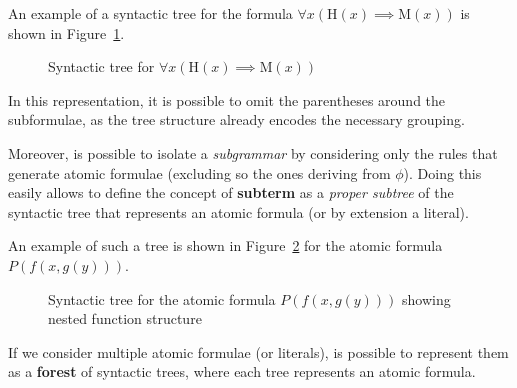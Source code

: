 An example of a syntactic tree for the formula \(\forall x \left(\text{H}(x) \implies \text{M}(x)\right)\) is shown in Figure~\ref{fig:syntactic_tree}.

\begin{figure}[H]
    \centering
    \caption{Syntactic tree for \(\forall x (\text{H}(x) \implies \text{M}(x))\)}\label{fig:syntactic_tree}
\end{figure}

In this representation, it is possible to omit the parentheses around the subformulae, as the tree structure already encodes the necessary grouping.

Moreover, is possible to isolate a \textit{subgrammar} by considering only the rules that generate atomic formulae (excluding so the ones deriving from \(\phi\)). Doing this easily allows to define the concept of \textbf{subterm} as a \textit{proper subtree} of the syntactic tree that represents an atomic formula (or by extension a literal).

An example of such a tree is shown in Figure~\ref{fig:subterm_tree} for the atomic formula \(P(f(x, g(y)))\).
\begin{figure}[H]
    \centering
    \caption{Syntactic tree for the atomic formula \(P(f(x, g(y)))\) showing nested function structure}\label{fig:subterm_tree}
\end{figure}

If we consider multiple atomic formulae (or literals), is possible to represent them as a \textbf{forest} of syntactic trees, where each tree represents an atomic formula.

